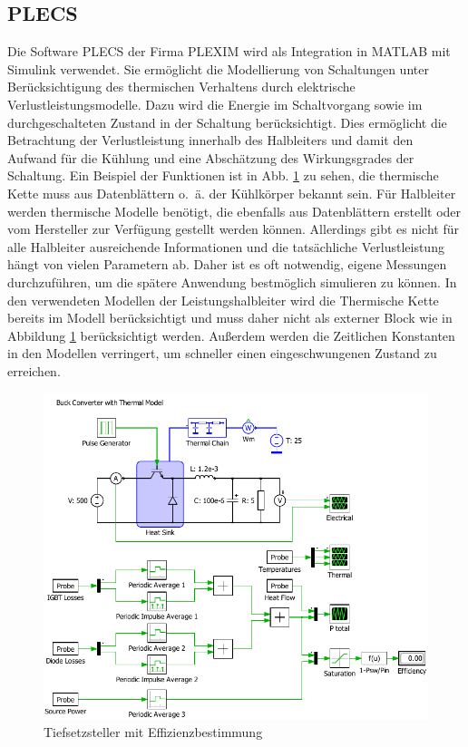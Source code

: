 	\subsection{PLECS}
	Die Software \gls{PLECS} der Firma PLEXIM wird als Integration in MATLAB mit Simulink verwendet.  Sie ermöglicht die Modellierung von Schaltungen unter Berücksichtigung des thermischen Verhaltens durch elektrische Verlustleistungsmodelle. Dazu wird die Energie im Schaltvorgang sowie im durchgeschalteten Zustand in der Schaltung berücksichtigt. Dies ermöglicht die Betrachtung der Verlustleistung innerhalb des Halbleiters und damit den Aufwand für die Kühlung und eine Abschätzung des Wirkungsgrades der Schaltung. Ein Beispiel der Funktionen ist in Abb. \ref{fig:plecsbuck} zu sehen, die thermische Kette muss aus Datenblättern o.~ä. der Kühlkörper bekannt sein. Für Halbleiter werden thermische Modelle benötigt, die ebenfalls aus Datenblättern erstellt oder vom Hersteller zur Verfügung gestellt werden können. Allerdings gibt es nicht für alle Halbleiter ausreichende Informationen und die tatsächliche Verlustleistung hängt von vielen Parametern ab. Daher ist es oft notwendig, eigene Messungen durchzuführen, um die spätere Anwendung bestmöglich simulieren zu können. In den verwendeten Modellen der Leistungshalbleiter wird die Thermische Kette bereits im Modell berücksichtigt und muss daher nicht als externer Block wie in Abbildung \ref{fig:plecsbuck} berücksichtigt werden. Außerdem werden die Zeitlichen Konstanten in den Modellen verringert, um schneller einen eingeschwungenen Zustand zu erreichen. \\
	
	\begin{figure}
		\centering
		\includegraphics[width=1\linewidth]{content/Grafiken/PLECS_Buck}
		\caption[Tiefsetzsteller mit Effizienzbestimmung]{Tiefsetzsteller mit Effizienzbestimmung}
		\label{fig:plecsbuck}
	\end{figure}
	